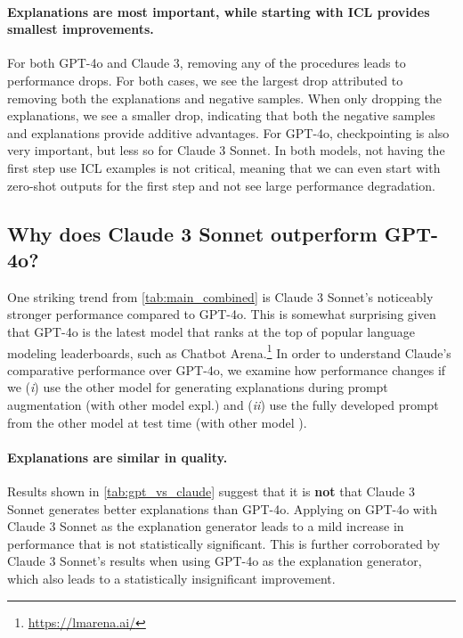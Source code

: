 \paragraph{Explanations are most important, while starting with ICL provides smallest improvements.}
For both GPT-4o and Claude 3, removing any of the procedures leads to performance drops. 
For both cases, we see the largest drop attributed to removing both the explanations and negative samples. 
When only dropping the explanations, we see a smaller drop, indicating that both the negative samples and explanations provide additive advantages. 
For GPT-4o, checkpointing is also very important, but less so for Claude 3 Sonnet. 
In both models, not having the first step use ICL examples is not critical, meaning that we can even start with zero-shot outputs for the first step and not see large performance degradation. 



\subsection{Why does Claude 3 Sonnet outperform GPT-4o?}
\label{sec:gpt_vs_claude}

One striking trend from \autoref{tab:main_combined} is Claude 3 Sonnet's noticeably stronger performance compared to GPT-4o. 
This is somewhat surprising given that GPT-4o is the latest model that ranks at the top of popular language modeling leaderboards, such as Chatbot Arena.\footnote{\url{https://lmarena.ai/}}
In order to understand Claude's comparative performance over GPT-4o, we examine how performance changes if we (\textit{i}) use the other model for generating explanations during prompt augmentation (with other model expl.) and (\textit{ii}) use the fully developed \ours prompt from the other model at test time (with other model \ours).  

\paragraph{Explanations are similar in quality.}
Results shown in \autoref{tab:gpt_vs_claude} suggest that it is \textbf{not} that Claude 3 Sonnet generates better explanations than GPT-4o. 
Applying \ours on GPT-4o with Claude 3 Sonnet as the explanation generator leads to a mild increase in performance that is not statistically significant. 
This is further corroborated by Claude 3 Sonnet's results when using GPT-4o as the explanation generator, which also leads to a statistically insignificant improvement. 

